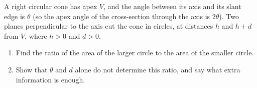 A right circular cone has apex $V$, and the angle between its axis and its slant edge is $\theta$ (so the apex angle of the cross-section through the axis is $2\theta$). Two planes perpendicular to the axis cut the cone in circles, at distances $h$ and $h+d$ from $V$, where $h>0$ and $d>0$.
\begin{enumerate}
\item[(a)] Find the ratio of the area of the larger circle to the area of the smaller circle.
\item[(b)] Show that $\theta$ and $d$ alone do not determine this ratio, and say what extra information is enough.
\end{enumerate}
